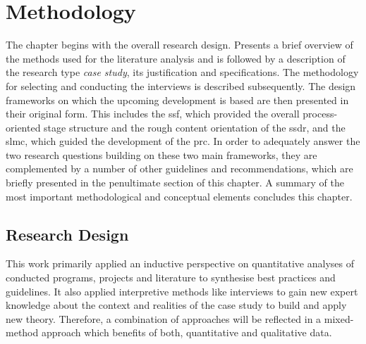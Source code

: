 \chapter{Methodology}

\label{chapter3}

The chapter begins with the overall research design. Presents a brief overview of the methods used for the literature analysis and is followed by a description of the research type \textit{case study}, its justification and specifications. The methodology for selecting and conducting the interviews is described subsequently. The design frameworks on which the upcoming development is based are then presented in their original form. This includes the \acrfull{ssf}, which provided the overall process-oriented stage structure and the rough content orientation of the \acrfull{ssdr}, and the \acrfull{slmc}, which guided the development of the \acrfull{prc}. In order to adequately answer the two research questions building on these two main frameworks, they are complemented by a number of other guidelines and recommendations, which are briefly presented in the penultimate section of this chapter. A summary of the most important methodological and conceptual elements concludes this chapter.


\section{Research Design}

This work primarily applied an inductive perspective on quantitative analyses of conducted programs, projects and literature to synthesise best practices and guidelines. It also applied interpretive methods like interviews to gain new expert knowledge about the context and realities of the case study to build and apply new theory. Therefore, a combination of approaches will be reflected in a mixed-method approach which benefits of both, quantitative and qualitative data.

